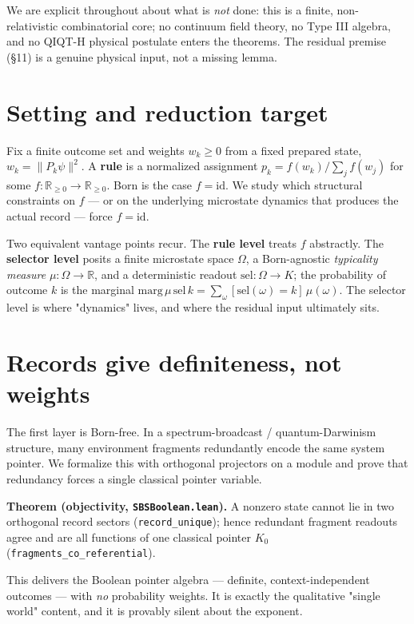 \documentclass[11pt,a4paper]{article}
\newenvironment{qiqtquote}{\begin{mdframed}[style=quotestyle]}{\end{mdframed}}
\begin{document}
We are explicit throughout about what is \emph{not} done: this is a finite, non-relativistic combinatorial core;
no continuum field theory, no Type III algebra, and no QIQT-H physical postulate enters the theorems. The
residual premise (§11) is a genuine physical input, not a missing lemma.

\section{Setting and reduction target}

Fix a finite outcome set and weights $w_k\ge 0$ from a fixed prepared state, $w_k=\lVert P_k\psi\rVert^2$.
A \textbf{rule} is a normalized assignment $p_k = f(w_k)/\sum_j f(w_j)$ for some $f:\mathbb{R}_{\ge0}\to\mathbb{R}_{\ge0}$. Born is the case $f=\mathrm{id}$. We study which structural constraints on $f$ — or on the
underlying microstate dynamics that produces the actual record — force $f=\mathrm{id}$.

Two equivalent vantage points recur. The \textbf{rule level} treats $f$ abstractly. The \textbf{selector level} posits
a finite microstate space $\Omega$, a Born-agnostic \emph{typicality measure} $\mu:\Omega\to\mathbb{R}$, and a
deterministic readout $\mathrm{sel}:\Omega\to K$; the probability of outcome $k$ is the marginal
$\mathrm{marg}\,\mu\,\mathrm{sel}\,k=\sum_{\omega}[\mathrm{sel}(\omega)=k]\,\mu(\omega)$. The selector level
is where "dynamics" lives, and where the residual input ultimately sits.

\section{Records give definiteness, not weights}

The first layer is Born-free. In a spectrum-broadcast / quantum-Darwinism structure, many environment
fragments redundantly encode the same system pointer. We formalize this with orthogonal projectors on a
module and prove that redundancy forces a single classical pointer variable.

\begin{qiqtquote}
\textbf{Theorem (objectivity, \texttt{SBSBoolean.lean}).} A nonzero state cannot lie in two orthogonal record sectors
(\texttt{record\_unique}); hence redundant fragment readouts agree and are all functions of one classical pointer
$K_0$ (\texttt{fragments\_co\_referential}).
\end{qiqtquote}

This delivers the Boolean pointer algebra — definite, context-independent outcomes — with \emph{no} probability
weights. It is exactly the qualitative "single world" content, and it is provably silent about the exponent.
\end{document}
